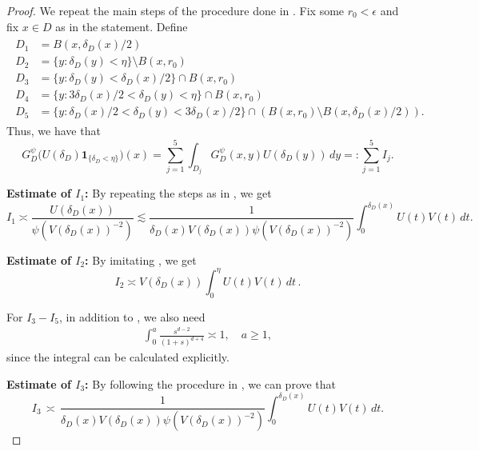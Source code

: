 \documentclass[12pt,a4paper,onecolumn]{article}
\theoremstyle{definition}
\newcommand{\1}{\mathbf 1}
\newcommand{\de}{\delta_D}
\newcommand{\GDP}{G_D^\psi}
\numberwithin{equation}{section}
\begin{document}
    \begin{proof}
    	We repeat the main steps of the procedure done in \cite[Lemma A.3]{Bio23cpaa}. Fix some  $r_0<\epsilon$ and fix $x\in D$ as in the statement. Define
        \begin{align*}
        	\begin{split}
        		D_1&= B(x, \delta_D(x)/2)\\
        		D_2&=\{y: \delta_D(y)<\eta\}\setminus B(x, r_0)\\
        		D_3&=\{y: \delta_D(y)<\delta_D(x)/2\}\cap B(x, r_0)\\
        		D_4&= \{y:3\delta_D(x)/2 < \delta_D(y)<\eta\}\cap B(x,r_0)\\
        		D_5&=\{y: \delta_D(x)/2<\delta_D(y)<3\delta_D(x)/2\}\cap (B(x, r_0)\setminus B(x, \delta_D(x)/2)).
        	\end{split}
        \end{align*}
        Thus, we have that
        $$
        \GDP\big(U(\de)\1_{\{\de<\eta\}}\big)(x)=\sum_{j=1}^5 \int_{D_j}\GDP(x,y)U(\de(y))\, dy =:\sum_{j=1}^5 I_j.
        $$ 
        
        \noindent
        {\bf Estimate of $I_1$:} By repeating the steps as in \cite[Estimate of $I_1$ in Lemma A.3]{Bio23cpaa}, we get
        \begin{equation*}
        	I_1\asymp \frac{U(\de(x))}{\psi(V(\de(x))^{-2})}\lesssim \frac{1}{\de(x)V(\de(x))\psi(V(\de(x))^{-2})}\int_0^{\de(x)}U(t)V(t)\,dt.
        \end{equation*}
        
        \noindent
        {\bf Estimate of $I_2$:} By imitating \cite[Estimate of $I_2$ in Lemma A.3]{Bio23cpaa}, we get
        \begin{equation*}
        	I_2\asymp V(\de(x)) \int_0^{\eta}U(t)V(t)\, dt\, .
        \end{equation*}
        
        For $I_3-I_5$, in addition to \cite[Eq. (A.9)]{Bio23cpaa}, we also need
        \begin{align*}
        	\int_0^a\frac{s^{d-2}}{(1+s)^{d+4}}\asymp 1,\quad a\ge 1,
        \end{align*}
        since the integral can be calculated explicitly.
        
        \noindent 
        {\bf Estimate of $I_3$:} By following the procedure in \cite[Estimate of $I_3$ in Lemma A.3]{Bio23cpaa}, we can prove that  
        \begin{equation*}
        	I_3\, \asymp\,\frac{1}{\de(x)V(\de(x))\psi(V(\de(x))^{-2})} \int_0^{\de(x)}U(t)V(t)\, dt.
        \end{equation*}
        

\end{proof}
\end{document}
